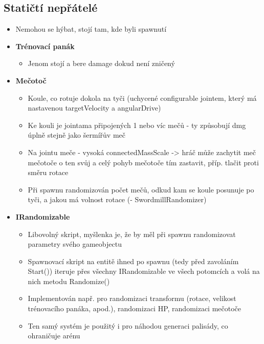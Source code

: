 \subsection{Statičtí nepřátelé}
\begin{itemize}
  \item Nemohou se hýbat, stojí tam, kde byli spawnutí
  \item \textbf{Trénovací panák}
    \begin{itemize}
      \item Jenom stojí a bere damage dokud není zničený
    \end{itemize}
  \item \textbf{Mečotoč}
    \begin{itemize}
      \item Koule, co rotuje dokola na tyči (uchycené configurable jointem, který má nastavenou targetVelocity a angularDrive)
      \item Ke kouli je jointama připojených 1 nebo víc mečů - ty způsobují dmg úplně stejně jako šermířův meč
      \item Na jointu meče - vysoká connectedMassScale -> hráč může zachytit meč mečotoče o ten svůj a celý pohyb mečotoče tím zastavit, příp. tlačit proti směru rotace
      \item Při spawnu randomizován počet mečů, odkud kam se koule posunuje po tyči, a jakou má volnost rotace (- SwordmillRandomizer)
    \end{itemize}
  \item \textbf{IRandomizable}
  \begin{itemize}
    \item Libovolný skript, myšlenka je, že by měl při spawnu randomizovat parametry svého gameobjectu
    \item Spawnovací skript na entitě ihned po spawnu (tedy před zavoláním Start()) iteruje přes všechny IRandomizable ve všech potomcích a volá na nich metodu Randomize()
    \item Implementován např. pro randomizaci transformu (rotace, velikost trénovacího panáka, apod.), randomizaci HP, randomizaci mečotoče
    \item Ten samý systém je použitý i pro náhodou generaci palisády, co ohraničuje arénu
  \end{itemize}
\end{itemize}


